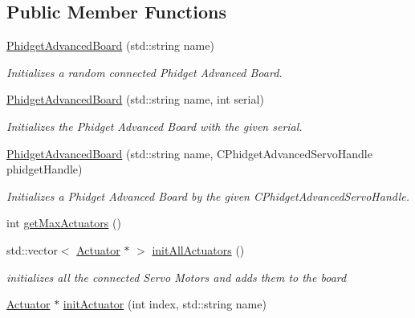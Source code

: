 \subsection*{Public Member Functions}
\begin{DoxyCompactItemize}
\item 
\hyperlink{classdrobot_1_1device_1_1actuator_1_1PhidgetAdvancedBoard_a53f9277915941763356e469cd496989a}{Phidget\-Advanced\-Board} (std\-::string name)
\begin{DoxyCompactList}\small\item\em Initializes a random connected Phidget Advanced Board. \end{DoxyCompactList}\item 
\hyperlink{classdrobot_1_1device_1_1actuator_1_1PhidgetAdvancedBoard_a579c025e9bec167387fb46972c1f0f26}{Phidget\-Advanced\-Board} (std\-::string name, int serial)
\begin{DoxyCompactList}\small\item\em Initializes the Phidget Advanced Board with the given serial. \end{DoxyCompactList}\item 
\hyperlink{classdrobot_1_1device_1_1actuator_1_1PhidgetAdvancedBoard_ac84c91f6fef690afe820185e0d0c7478}{Phidget\-Advanced\-Board} (std\-::string name, C\-Phidget\-Advanced\-Servo\-Handle phidget\-Handle)
\begin{DoxyCompactList}\small\item\em Initializes a Phidget Advanced Board by the given C\-Phidget\-Advanced\-Servo\-Handle. \end{DoxyCompactList}\item 
int \hyperlink{classdrobot_1_1device_1_1actuator_1_1PhidgetAdvancedBoard_aec2cc528d8ec70e2200709d4c5ac2bf3}{get\-Max\-Actuators} ()
\item 
std\-::vector$<$ \hyperlink{classdrobot_1_1device_1_1actuator_1_1Actuator}{Actuator} $\ast$ $>$ \hyperlink{classdrobot_1_1device_1_1actuator_1_1PhidgetAdvancedBoard_a6e1564a695e5a768c14387bedfb62964}{init\-All\-Actuators} ()
\begin{DoxyCompactList}\small\item\em initializes all the connected Servo Motors and adds them to the board \end{DoxyCompactList}\item 
\hyperlink{classdrobot_1_1device_1_1actuator_1_1Actuator}{Actuator} $\ast$ \hyperlink{classdrobot_1_1device_1_1actuator_1_1PhidgetAdvancedBoard_aebc591871392ebd002fcca35b7405587}{init\-Actuator} (int index, std\-::string name)

\end{DoxyCompactItemize}
